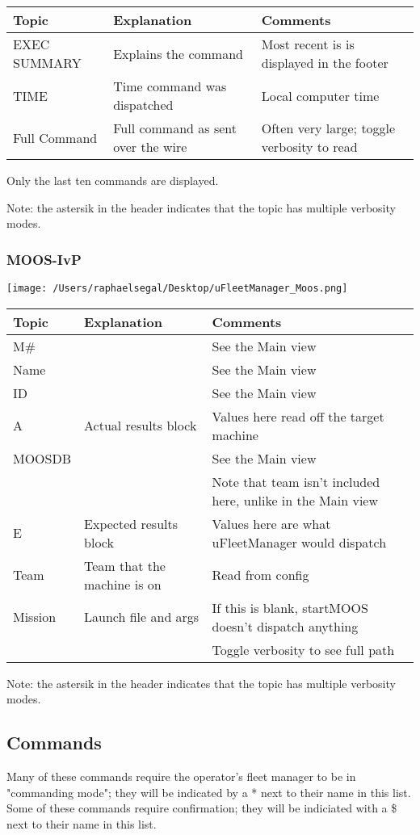 \documentclass[11pt]{article}
\begin{document}
\begin{tabular}{l|ll}
Topic & Explanation & Comments\\
\hline
EXEC SUMMARY & Explains the command & Most recent is is displayed in the footer\\
TIME & Time command was dispatched & Local computer time\\
Full Command & Full command as sent over the wire & Often very large; toggle verbosity to read
\end{tabular}

Only the last ten commands are displayed. 

Note: the astersik in the header indicates that the topic has multiple verbosity modes.
\subsubsection{MOOS-IvP}
\texttt{[image: /Users/raphaelsegal/Desktop/uFleetManager\_Moos.png]}

\begin{tabular}{l|ll}
Topic & Explanation & Comments\\
\hline
M\# && See the Main view\\
Name && See the Main view\\
ID && See the Main view\\
A & Actual results block & Values here read off the target machine\\
MOOSDB && See the Main view\\&&Note that team isn't included here, unlike in the Main view\\
E & Expected results block & Values here are what uFleetManager would dispatch\\
Team & Team that the machine is on & Read from config\\
Mission & Launch file and args & If this is blank, startMOOS doesn't dispatch anything\\ && Toggle verbosity to see full path\\
\end{tabular}

Note: the astersik in the header indicates that the topic has multiple verbosity modes.

\subsection{Commands}
Many of these commands require the operator's fleet manager to be in "commanding mode"; they will be indicated by a * next to their name in this list. Some of these commands require confirmation; they will be indiciated with a \$ next to their name in this list.
\end{document}
